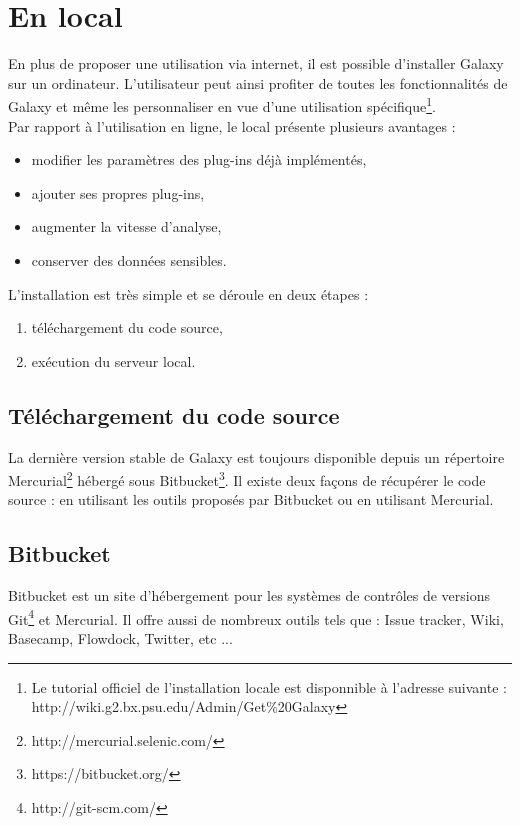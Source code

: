 \section{En local}

En plus de proposer une utilisation via internet, il est possible d'installer Galaxy sur un ordinateur. L'utilisateur peut ainsi profiter de toutes les fonctionnalités de Galaxy et même les personnaliser en vue d'une utilisation spécifique\footnote{Le tutorial officiel de l'installation locale est disponnible à l'adresse suivante :\\ http://wiki.g2.bx.psu.edu/Admin/Get\%20Galaxy}.\\

Par rapport à l'utilisation en ligne, le local présente plusieurs avantages :
\begin{itemize}
\item modifier les paramètres des plug-ins déjà implémentés,
\item ajouter ses propres plug-ins,
\item augmenter la vitesse d'analyse,
\item conserver des données sensibles.\\
\end{itemize}

L'installation est très simple et se déroule en deux étapes :
\begin{enumerate}
\item téléchargement du code source,
\item exécution du serveur local.
\end{enumerate}

\subsection{Téléchargement du code source}

La dernière version stable de Galaxy est toujours disponible depuis un répertoire Mercurial\footnote{http://mercurial.selenic.com/} hébergé sous Bitbucket\footnote{https://bitbucket.org/}. Il existe deux façons de récupérer le code source : en utilisant les outils proposés par Bitbucket ou en utilisant Mercurial.

\subsection*{Bitbucket}

Bitbucket est un site d'hébergement pour les systèmes de contrôles de versions Git\footnote{http://git-scm.com/} et Mercurial. Il offre aussi de nombreux outils tels que : Issue tracker, Wiki, Basecamp, Flowdock, Twitter, etc ...\\

